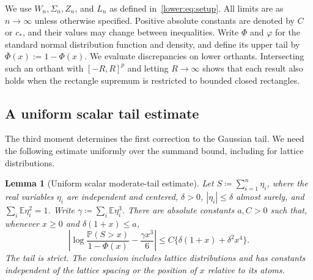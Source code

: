 \documentclass[11pt,letterpaper]{article}
\newtheorem{lemma}{Lemma}
\theoremstyle{remark}
\newcommand{\E}{\mathbb E}
\newcommand{\Pp}{\mathbb P}
\begin{document}
We use \(W_n,\Sigma_n,Z_n\), and \(L_n\) as defined
in~\eqref{lower:eq:setup}. All limits are as \(n\to\infty\) unless
otherwise specified. Positive absolute constants are denoted by
\(C\) or \(c_*\), and their values may change between inequalities.
Write \(\Phi\) and \(\varphi\) for the standard normal distribution
function and density, and define its upper tail by
\(\bar\Phi(x):=1-\Phi(x)\).
We evaluate discrepancies on lower orthants. Intersecting such an
orthant with \([-R,R]^p\) and letting \(R\to\infty\) shows that each
result also holds when the rectangle supremum is restricted to bounded
closed rectangles.

\subsection{A uniform scalar tail estimate}
\label{app:moderate-tail-proof}
The third moment determines the first correction to the Gaussian
tail. We need the following estimate uniformly over the summand
bound, including for lattice distributions.

\begin{lemma}[Uniform scalar moderate-tail estimate]
\label{opt:moderate-tail}
Let \(S\coloneqq\sum_{i=1}^n\eta_i\), where the real variables \(\eta_i\) are
independent and centered, \(\delta>0\), \(|\eta_i|\le\delta\)
almost surely, and
\(\sum_i\E\eta_i^2=1\). Write
\(\gamma\coloneqq\sum_i\E\eta_i^3\). There are absolute constants \(a,C>0\)
such that, whenever \(x\ge0\) and \(\delta(1+x)\le a\),
\begin{equation}
 \left|\log\frac{\Pp(S>x)}{1-\Phi(x)}
       -\frac{\gamma x^3}{6}\right|
 \le C\{\delta(1+x)+\delta^2x^4\}.
 \label{opt:moderate-tail-formula}
\end{equation}
The tail is strict. The conclusion includes lattice distributions and
has constants independent of the lattice spacing or the position of
\(x\) relative to its atoms.
\end{lemma}
\end{document}
